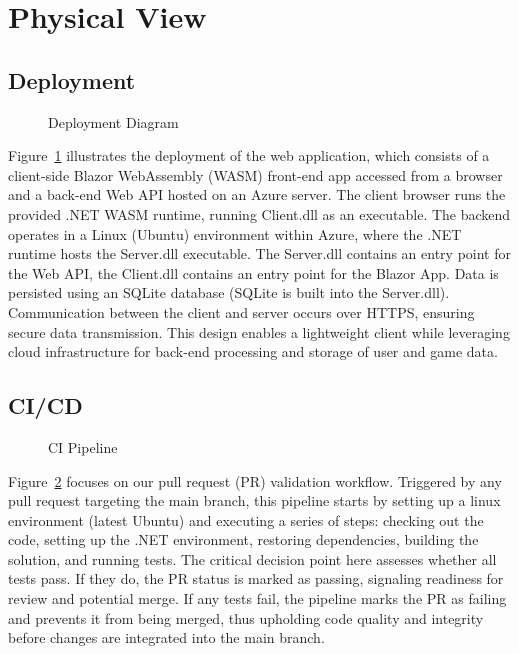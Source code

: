 \documentclass[11pt,a4paper]{article}
\newcommand{\inputdiagram}[1]{}
\newcommand{\textwidthdiagram}[2][1]{%
  \resizebox{#1\textwidth}{!}{\inputdiagram{#2}}%
}
\begin{document}
\section{Physical View}
\subsection{Deployment}
\begin{figure}[H]
    \centering
    \begin{adjustbox}{width=0.92\paperwidth,center}
        \inputdiagram{deployment_diagram.tex}
     \end{adjustbox}
    \caption{Deployment Diagram}
    \label{fig:deployment_diagram}
\end{figure}

Figure~\ref{fig:deployment_diagram} illustrates the deployment of the web
application, which consists of a client-side Blazor WebAssembly (WASM)
front-end app accessed from a browser and a back-end Web API hosted on
an Azure server. The client browser runs the provided .NET WASM runtime,
running Client.dll as an executable. The backend operates in a Linux (Ubuntu)
environment within Azure, where the .NET runtime hosts the Server.dll
executable. The Server.dll contains an entry point for the Web API, the
Client.dll contains an entry point for the Blazor App. Data is persisted using
an SQLite database (SQLite is built into the Server.dll). Communication
between the client and server occurs over HTTPS, ensuring secure data
transmission. This design enables a lightweight client while leveraging
cloud infrastructure for back-end processing and storage of user and game data.

\subsection{CI/CD}

\begin{figure}[H]
        \centering
        \textwidthdiagram[0.8]{CI.tex}
        \caption{CI Pipeline}
        \label{fig:CI_pipeline}
\end{figure}
Figure~\ref{fig:CI_pipeline} focuses on our pull request (PR) validation
workflow. Triggered by any pull request targeting the main branch, this
pipeline starts by setting up a linux environment (latest Ubuntu) and
executing a series of steps: checking out the code, setting up the .NET
environment, restoring dependencies, building the solution, and running
tests. The critical decision point here assesses whether all tests pass. If
they do, the PR status is marked as passing, signaling readiness for review
and potential merge. If any tests fail, the pipeline marks the PR as failing
and prevents it from being merged, thus upholding code quality and integrity
before changes are integrated into the main branch.
\end{document}
